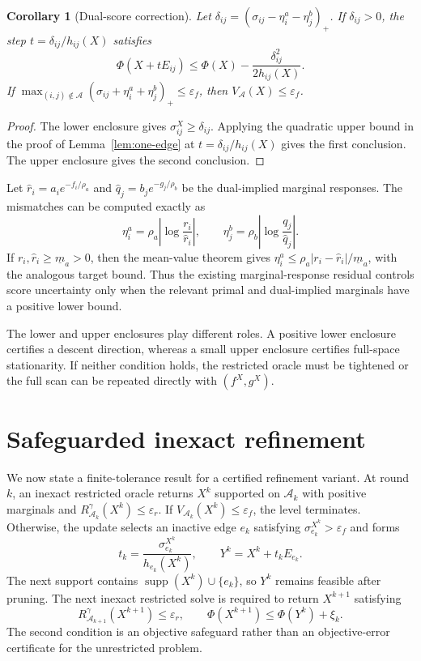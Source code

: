 \documentclass[11pt]{article}
\newtheorem{corollary}{Corollary}
\newcommand{\supp}{\operatorname{supp}}
\begin{document}
\begin{corollary}[Dual-score correction]\label{cor:dual-correction}
Let $\delta_{ij}=(\sigma_{ij}-\eta_i^a-\eta_j^b)_+$.
If $\delta_{ij}>0$, the step $t=\delta_{ij}/h_{ij}(X)$ satisfies
$$\Phi(X+tE_{ij})\leq\Phi(X)-\frac{\delta_{ij}^2}{2h_{ij}(X)}.$$
If $\max_{(i,j)\notin\mathcal A}(\sigma_{ij}+\eta_i^a+\eta_j^b)_+\leq\varepsilon_f$, then $V_{\mathcal A}(X)\leq\varepsilon_f$.
\end{corollary}

\begin{proof}
The lower enclosure gives $\sigma_{ij}^X\geq\delta_{ij}$.
Applying the quadratic upper bound in the proof of Lemma~\ref{lem:one-edge} at $t=\delta_{ij}/h_{ij}(X)$ gives the first conclusion.
The upper enclosure gives the second conclusion.
\end{proof}

Let $\widehat r_i=a_i e^{-f_i/\rho_a}$ and $\widehat q_j=b_j e^{-g_j/\rho_b}$ be the dual-implied marginal responses.
The mismatches can be computed exactly as
$$\eta_i^a=\rho_a\left|\log\frac{r_i}{\widehat r_i}\right|,\qquad \eta_j^b=\rho_b\left|\log\frac{q_j}{\widehat q_j}\right|.$$
If $r_i,\widehat r_i\geq\underline m_a>0$, then the mean-value theorem gives $\eta_i^a\leq\rho_a|r_i-\widehat r_i|/\underline m_a$, with the analogous target bound.
Thus the existing marginal-response residual controls score uncertainty only when the relevant primal and dual-implied marginals have a positive lower bound.

The lower and upper enclosures play different roles.
A positive lower enclosure certifies a descent direction, whereas a small upper enclosure certifies full-space stationarity.
If neither condition holds, the restricted oracle must be tightened or the full scan can be repeated directly with $(f^X,g^X)$.

\section{Safeguarded inexact refinement}

We now state a finite-tolerance result for a certified refinement variant.
At round $k$, an inexact restricted oracle returns $X^k$ supported on $\mathcal A_k$ with positive marginals and $R_{\mathcal A_k}^{\gamma}(X^k)\leq\varepsilon_r$.
If $V_{\mathcal A_k}(X^k)\leq\varepsilon_f$, the level terminates.
Otherwise, the update selects an inactive edge $e_k$ satisfying $\sigma_{e_k}^{X^k}>\varepsilon_f$ and forms
$$t_k=\frac{\sigma_{e_k}^{X^k}}{h_{e_k}(X^k)},\qquad Y^k=X^k+t_kE_{e_k}.$$
The next support contains $\supp(X^k)\cup\{e_k\}$, so $Y^k$ remains feasible after pruning.
The next inexact restricted solve is required to return $X^{k+1}$ satisfying
$$R_{\mathcal A_{k+1}}^{\gamma}(X^{k+1})\leq\varepsilon_r,\qquad \Phi(X^{k+1})\leq\Phi(Y^k)+\xi_k.$$
The second condition is an objective safeguard rather than an objective-error certificate for the unrestricted problem.
\end{document}
